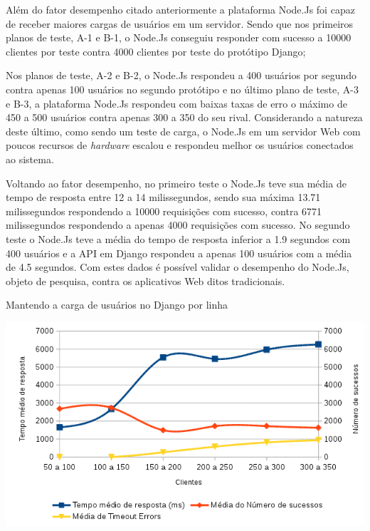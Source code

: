   Além do fator desempenho citado anteriormente a plataforma Node.Js foi capaz
  de receber maiores cargas de usuários em um servidor. Sendo que nos 
  primeiros planos de teste, A-1 e B-1, o Node.Js conseguiu responder com sucesso a 10000 clientes por teste contra 
  4000 clientes por teste do protótipo Django; 
  
  Nos planos de teste, A-2 e B-2, o Node.Js respondeu a 400 usuários por segundo contra apenas 100 usuários no segundo protótipo e 
  no último plano de teste, A-3 e B-3, a plataforma Node.Js respondeu com baixas taxas de erro
  o máximo de 450 a 500 usuários contra apenas 300 a 350 do seu rival. Considerando a natureza deste último, como
  sendo um teste de carga, o Node.Js em um servidor Web com poucos recursos de \textit{hardware} escalou e respondeu melhor
  os usuários conectados ao sistema.
  
  Voltando ao fator desempenho, no primeiro teste o Node.Js teve sua média de tempo de resposta entre 12 a 14 milissegundos, sendo 
  sua máxima 13.71 milissegundos respondendo a 10000 requisições com sucesso, contra 6771 milissegundos respondendo a apenas 4000
  requisições com sucesso. No segundo teste o Node.Js teve a média do tempo de resposta inferior a  1.9 segundos com 400 usuários
  e a API em Django respondeu a apenas 100 usuários com a média de 4.5 segundos. Com estes dados é possível validar o desempenho
  do Node.Js, objeto de pesquisa, contra os aplicativos Web ditos tradicionais.
 
  \begin{grafico}[H]
    \setlength{\abovecaptionskip}{5pt}
    \setlength{\belowcaptionskip}{0pt}

    \caption[Mantendo a carga de usuários no Django por linha]
	    {Mantendo a carga de usuários no Django por linha}
    \centering
    \includegraphics[width=.80\textwidth]{imagem/graficos/grafico_django_plano_de_teste_3_line.png}
    \captionsetup[grafico]{justification=centering}
    \label{grafico:teste-mantendo-carga-usuario-django-line}
  \end{grafico}
  
